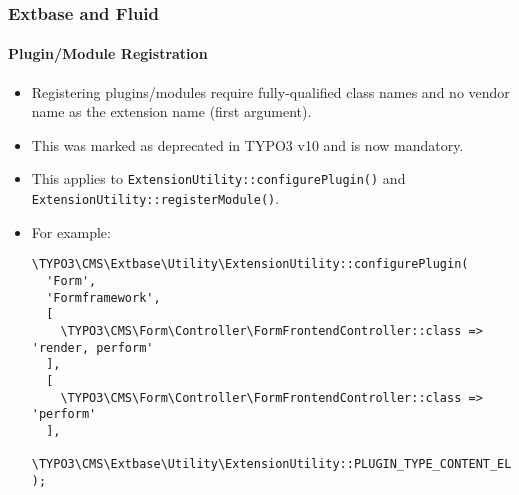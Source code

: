 %

\begin{frame}[fragile]
	\frametitle{Extbase and Fluid}
	\framesubtitle{Plugin/Module Registration}

	\lstset{basicstyle=\tiny\ttfamily}

	\begin{itemize}
		\item Registering plugins/modules require fully-qualified class names
			and no vendor name as the extension name (first argument).
		\item This was marked as deprecated in TYPO3 v10 and is now mandatory.
		\item This applies to
			\small\texttt{ExtensionUtility::configurePlugin()}\normalsize
			and
			\small\texttt{ExtensionUtility::registerModule()}.
		\item For example:
\begin{lstlisting}
\TYPO3\CMS\Extbase\Utility\ExtensionUtility::configurePlugin(
  'Form',
  'Formframework',
  [
    \TYPO3\CMS\Form\Controller\FormFrontendController::class => 'render, perform'
  ],
  [
    \TYPO3\CMS\Form\Controller\FormFrontendController::class => 'perform'
  ],
  \TYPO3\CMS\Extbase\Utility\ExtensionUtility::PLUGIN_TYPE_CONTENT_ELEMENT
);
\end{lstlisting}

	\end{itemize}

\end{frame}

